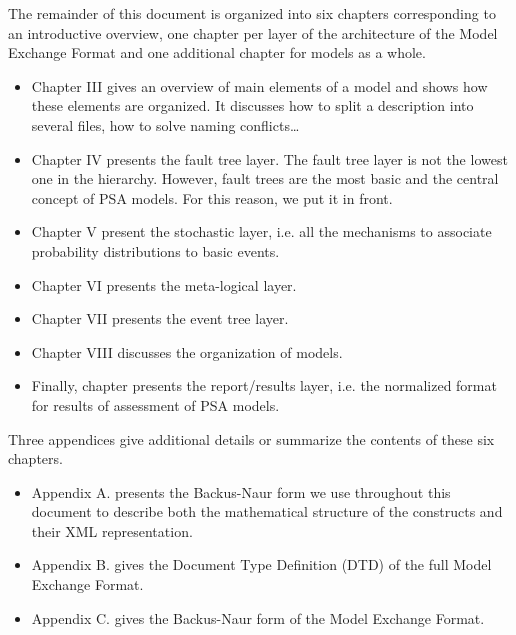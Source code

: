 \documentclass[11pt]{article}
\begin{document}
The remainder of this document is organized into six chapters
corresponding to an introductive overview, one chapter per layer of the
architecture of the Model Exchange Format and one additional chapter for
models as a whole.

\begin{itemize}
\item Chapter III gives an overview of main elements of a model and shows
how these elements are organized. It discusses how to split a
description into several files, how to solve naming conflicts\ldots{}

\item Chapter IV presents the fault tree layer. The fault tree layer is not
the lowest one in the hierarchy. However, fault trees are the most
basic and the central concept of PSA models. For this reason, we put
it in front.

\item Chapter V present the stochastic layer, i.e. all the mechanisms to
associate probability distributions to basic events.

\item Chapter VI presents the meta-logical layer.

\item Chapter VII presents the event tree layer.

\item Chapter VIII discusses the organization of models.

\item Finally, chapter presents the report/results layer, i.e. the
normalized format for results of assessment of PSA models.
\end{itemize}

Three appendices give additional details or summarize the contents of
these six chapters.

\begin{itemize}
\item Appendix A. presents the Backus-Naur form we use throughout this
document to describe both the mathematical structure of the
constructs and their XML representation.

\item Appendix B. gives the Document Type Definition (DTD) of the full
Model Exchange Format.

\item Appendix C. gives the Backus-Naur form of the Model Exchange Format.
\end{itemize}
\end{document}
